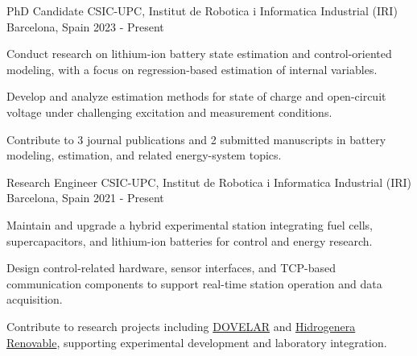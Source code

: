 

\begin{cventries}

  \cventry
    {PhD Candidate}
    {CSIC-UPC, Institut de Robotica i Informatica Industrial (IRI)}
    {Barcelona, Spain}
    {2023 - Present}
    {
      \begin{cvitems}
        \item {Conduct research on lithium-ion battery state estimation and control-oriented modeling, with a focus on regression-based estimation of internal variables.}
        \item {Develop and analyze estimation methods for state of charge and open-circuit voltage under challenging excitation and measurement conditions.}
        \item {Contribute to 3 journal publications and 2 submitted manuscripts in battery modeling, estimation, and related energy-system topics.}
      \end{cvitems}
    }

  \cventry
    {Research Engineer}
    {CSIC-UPC, Institut de Robotica i Informatica Industrial (IRI)}
    {Barcelona, Spain}
    {2021 - Present}
    {
      \begin{cvitems}
        \item {Maintain and upgrade a hybrid experimental station integrating fuel cells, supercapacitors, and lithium-ion batteries for control and energy research.}
        \item {Design control-related hardware, sensor interfaces, and TCP-based communication components to support real-time station operation and data acquisition.}
        \item {Contribute to research projects including \href{https://www.iri.upc.edu/project/show/225}{DOVELAR} and \href{https://pti-transener.csic.es/hidrogenera-renovable-60-kg-h2-dia/}{Hidrogenera Renovable}, supporting experimental development and laboratory integration.}
      \end{cvitems}
    }


\end{cventries}
